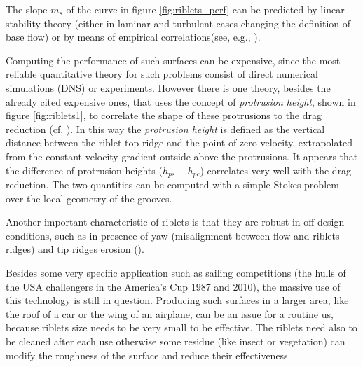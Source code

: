 The slope $m_s$ of the curve in figure \ref{fig:riblets_perf} can be predicted by linear stability theory (either in laminar and turbulent cases changing the definition of base flow) or by means of empirical correlations(see, e.g., \citet{garcia2011hydrodynamic}).

Computing the performance of such surfaces can be expensive, since the most reliable quantitative theory for such problems consist of direct numerical simulations (DNS) or experiments.
However there is one theory, besides the already cited expensive ones, that uses the concept of \textit{protrusion height}, shown in figure \ref{fig:riblets1}, to correlate the shape of these protrusions to the drag reduction (cf. \citet{luchini1991resistance}).
In this way the \textit{protrusion height} is defined as the vertical distance between the riblet top ridge and the point of zero velocity, extrapolated from the constant velocity gradient outside above the protrusions.
It appears that the difference of protrusion heights ($h_{ps} - h_{pc}$) correlates very well with the drag reduction. The two quantities can be computed with a simple Stokes problem over the local geometry of the grooves.
%
%

Another important characteristic of riblets is that they are robust in off-design conditions, such as in presence of yaw (misalignment between flow and riblets ridges) and tip ridges erosion (\citet{garcia2011drag}).

Besides some very specific application such as sailing competitions (the hulls of the USA challengers in the America’s Cup 1987 and 2010), the massive use of this technology is still in question.
Producing such surfaces in a larger area, like the roof of a car or the wing of an airplane, can be an issue for a routine us, because riblets size needs to be very small to be effective. The riblets need also to be cleaned after each use otherwise some residue (like insect or vegetation) can modify the roughness of the surface and reduce their effectiveness.

